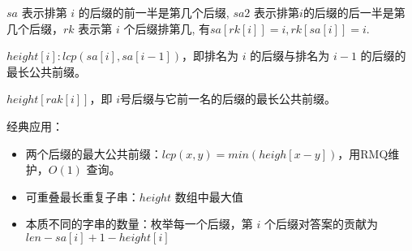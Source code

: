 $sa$ 表示排第 $i$ 的后缀的前一半是第几个后缀, $sa2$ 表示排第$i$的后缀的后一半是第几个后缀，$rk$ 表示第 $i$ 个后缀排第几, 有$sa[rk[i]]=i, rk[sa[i]]=i$. 

$height[i]: lcp(sa[i],sa[i−1]) $，即排名为 $i$ 的后缀与排名为 $i−1$ 的后缀的最长公共前缀。

$height[rak[i]]$，即 $i$​ 号后缀与它前一名的后缀的最长公共前缀。

经典应用：
\begin{itemize}
    \item 两个后缀的最大公共前缀：$lcp(x,y)=min(heigh[x-y])$，用RMQ维护，$O(1)$ 查询。
    \item 可重叠最长重复子串：$height$ 数组中最大值
    \item 本质不同的字串的数量：枚举每一个后缀，第 $i$ 个后缀对答案的贡献为 $len-sa[i]+1-height[i]$
\end{itemize}